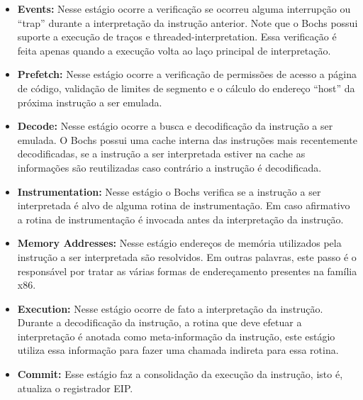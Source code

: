 \documentclass[11pt,twoside]{article}
\begin{document}
\begin{itemize}
	\item \textbf{Events:} Nesse estágio ocorre a verificação se ocorreu
          alguma interrupção ou ``trap'' durante a interpretação da instrução
          anterior. Note que o Bochs possui suporte a execução de traços e
          threaded-interpretation. Essa verificação é feita apenas quando a
          execução volta ao laço principal de interpretação.

	\item \textbf{Prefetch:} Nesse estágio ocorre a verificação de
          permissões de acesso a página de código, validação de limites de
          segmento e o cálculo do endereço ``host'' da próxima instrução a ser
          emulada.

	\item \textbf{Decode:} Nesse estágio ocorre a busca e decodificação da
          instrução a ser emulada. O Bochs possui uma cache interna das
          instruções mais recentemente decodificadas, se a instrução a ser
          interpretada estiver na cache as informações são reutilizadas caso
          contrário a instrução é decodificada.

	\item \textbf{Instrumentation:} Nesse estágio o Bochs verifica se a
          instrução a ser interpretada é alvo de alguma rotina de
          instrumentação. Em caso afirmativo a rotina de instrumentação é
          invocada antes da interpretação da instrução.

	\item \textbf{Memory Addresses:} Nesse estágio endereços de memória
          utilizados pela instrução a ser interpretada são resolvidos.  Em
          outras palavras, este passo é o responsável por tratar as várias
          formas de endereçamento presentes na família x86.

	\item \textbf{Execution:} Nesse estágio ocorre de fato a interpretação
          da instrução. Durante a decodificação da instrução, a rotina que deve
          efetuar a interpretação é anotada como meta-informação da instrução,
          este estágio utiliza essa informação para fazer uma chamada indireta
          para essa rotina.

	\item \textbf{Commit:} Esse estágio faz a consolidação da execução da
          instrução, isto é, atualiza o registrador EIP.

\end{itemize}
\end{document}
